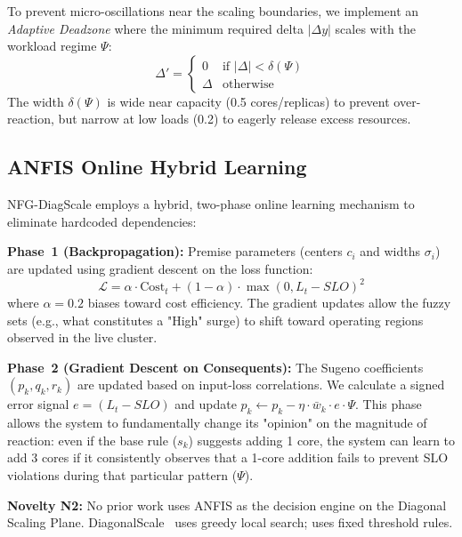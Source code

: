 \documentclass[conference]{IEEEtran}
\begin{document}
To prevent micro-oscillations near the scaling boundaries, we implement an \emph{Adaptive Deadzone} where the minimum required delta $|\Delta y|$ scales with the workload regime $\Psi$:
\begin{equation}
\label{eq:deadzone}
\Delta' = \begin{cases} 0 & \text{if } |\Delta| < \delta(\Psi) \\ \Delta & \text{otherwise} \end{cases}
\end{equation}
The width $\delta(\Psi)$ is wide near capacity (0.5 cores/replicas) to prevent over-reaction, but narrow at low loads (0.2) to eagerly release excess resources.

\subsection{ANFIS Online Hybrid Learning}
\label{sec:learning}

NFG-DiagScale employs a hybrid, two-phase online learning mechanism to eliminate hardcoded dependencies:

\textbf{Phase~1 (Backpropagation):} Premise parameters (centers $c_i$ and widths $\sigma_i$) are updated using gradient descent on the loss function:
\begin{equation}
\label{eq:anfis_loss}
\mathcal{L} = \alpha \cdot \text{Cost}_t + (1-\alpha) \cdot \max(0, L_t - SLO)^2
\end{equation}
where $\alpha=0.2$ biases toward cost efficiency. The gradient updates allow the fuzzy sets (e.g., what constitutes a "High" surge) to shift toward operating regions observed in the live cluster.

\textbf{Phase~2 (Gradient Descent on Consequents):} The Sugeno coefficients $(p_k, q_k, r_k)$ are updated based on input-loss correlations. We calculate a signed error signal $e = (L_t - SLO)$ and update $p_k \leftarrow p_k - \eta \cdot \bar{w}_k \cdot e \cdot \Psi$. This phase allows the system to fundamentally change its "opinion" on the magnitude of reaction: even if the base rule ($s_k$) suggests adding 1 core, the system can learn to add 3 cores if it consistently observes that a 1-core addition fails to prevent SLO violations during that particular pattern ($\Psi$).

\textbf{Novelty N2:} No prior work uses ANFIS as the decision engine on the Diagonal Scaling Plane. DiagonalScale~\cite{abdullah2025diagonal} uses greedy local search; \cite{solino2025autonomic} uses fixed threshold rules.
\end{document}
